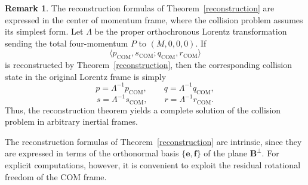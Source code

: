 \documentclass[12pt]{article}
\theoremstyle{plain}
\theoremstyle{definition}
\newtheorem{remark}[theorem]{Remark}
\begin{document}
\begin{remark}
The reconstruction formulas of Theorem~\ref{reconstruction} are expressed in the center of momentum frame, where the collision problem assumes its simplest form. Let $\Lambda$ be the proper orthochronous Lorentz transformation sending the total four-momentum $P$ to $(M,0,0,0)$. If
\[
\langle p_{\mathrm{COM}},s_{\mathrm{COM}}; q_{\mathrm{COM}}, r_{\mathrm{COM}}\rangle
\]
is reconstructed by Theorem~\ref{reconstruction}, then the corresponding collision state in the original Lorentz frame is simply
\[
p=\Lambda^{-1}p_{\mathrm{COM}},\qquad
q=\Lambda^{-1}q_{\mathrm{COM}},
\]
\[
s=\Lambda^{-1}s_{\mathrm{COM}},\qquad
r=\Lambda^{-1}r_{\mathrm{COM}}.
\]
Thus, the reconstruction theorem yields a complete solution of the collision problem in arbitrary inertial frames.
\end{remark}
The reconstruction formulas of Theorem~\ref{reconstruction} are intrinsic,
since they are expressed in terms of the orthonormal basis
$\{{\bm e},{\bm f}\}$ of the plane ${\bm B}^{\perp}$.
For explicit computations, however, it is convenient to exploit the
residual rotational freedom of the COM frame.
\end{document}
